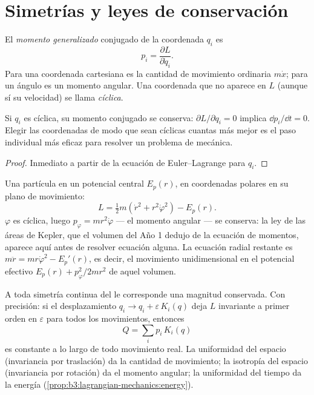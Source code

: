 \section{Simetrías y leyes de conservación}

\begin{definition}\label{def:b3:lagrangian-mechanics:momentum}
El \emph{momento generalizado} conjugado de la coordenada $q_i$ es
\[
p_i = \frac{\partial L}{\partial\dot q_i} .
\]
Para una coordenada cartesiana es la cantidad de movimiento ordinaria
$m\dot x$; para un ángulo es un momento angular. Una coordenada que no
aparece en $L$ (aunque sí su velocidad) se llama \emph{cíclica}.
\end{definition}

\begin{proposition}\label{prop:b3:lagrangian-mechanics:cyclic}
Si $q_i$ es cíclica, su momento conjugado se conserva:
$\partial L/\partial q_i = 0$ implica $\dd p_i/\dd t = 0$. Elegir las
coordenadas de modo que sean cíclicas cuantas más mejor es el paso
individual más eficaz para resolver un problema de mecánica.
\end{proposition}

\begin{proof}
Inmediato a partir de la ecuación de Euler--Lagrange para $q_i$.
\end{proof}

\begin{example}\label{ex:b3:lagrangian-mechanics:central}
Una partícula en un potencial central $E_p(r)$, en coordenadas polares en su
plano de movimiento:
\[
L = \tfrac12 m(\dot r^2 + r^2\dot\varphi^2) - E_p(r) .
\]
$\varphi$ es cíclica, luego $p_\varphi = mr^2\dot\varphi$ --- el momento
angular --- se conserva: la ley de las áreas de Kepler, que el volumen del
Año 1 dedujo de la ecuación de momentos, aparece aquí antes de resolver
ecuación alguna. La ecuación radial restante es
$m\ddot r = mr\dot\varphi^2 - E_p'(r)$, es decir, el movimiento
unidimensional en el potencial efectivo $E_p(r) + p_\varphi^2/2mr^2$ de
aquel volumen.
\end{example}

\begin{theorem}\label{thm:b3:lagrangian-mechanics:noether}
A toda simetría continua del  le corresponde una magnitud
conservada. Con precisión: si el desplazamiento
$q_i \to q_i + \varepsilon\,K_i(q)$ deja $L$ invariante a primer orden en
$\varepsilon$ para todos los movimientos,
entonces
\[
Q = \sum_i p_i\,K_i(q)
\]
es constante a lo largo de todo movimiento real. La uniformidad del espacio
(invariancia por traslación) da la cantidad de movimiento; la isotropía del
espacio (invariancia por rotación) da el momento angular; la uniformidad del
tiempo da la energía (\cref{prop:b3:lagrangian-mechanics:energy}).
\end{theorem}

